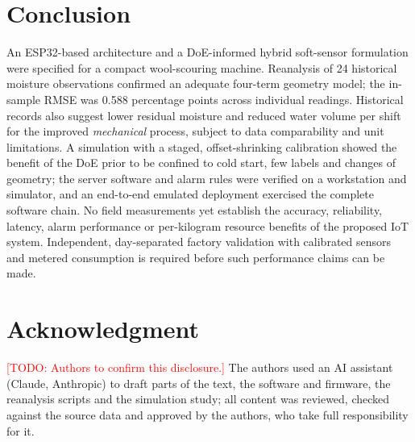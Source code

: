 \documentclass[journal]{IEEEtran}
\newcommand{\TODO}[1]{\textcolor{red}{[TODO: #1]}}
\begin{document}
\section{Conclusion}
An ESP32-based architecture and a DoE-informed hybrid soft-sensor formulation
were specified for a compact wool-scouring machine. Reanalysis of 24 historical
moisture observations confirmed an adequate four-term geometry model; the
in-sample RMSE was 0.588 percentage points across individual readings.
Historical records also suggest lower residual moisture and reduced water
volume per shift for the improved \emph{mechanical} process, subject to data
comparability and unit limitations. A simulation with a staged, offset-shrinking
calibration showed the benefit of the DoE prior to be confined to cold start, few
labels and changes of geometry; the server software and alarm rules were verified
on a workstation and simulator, and an end-to-end emulated deployment exercised the complete
software chain. No field measurements yet establish the
accuracy, reliability, latency, alarm performance or per-kilogram resource
benefits of the proposed IoT system. Independent, day-separated factory
validation with calibrated sensors and metered consumption is required before
such performance claims can be made.

\section*{Acknowledgment}
\TODO{Authors to confirm this disclosure.} The authors used an AI assistant (Claude, Anthropic) to draft parts of the
text, the software and firmware, the reanalysis scripts and the simulation study; all content was reviewed, checked
against the source data and approved by the authors, who take full responsibility for it.
\end{document}
